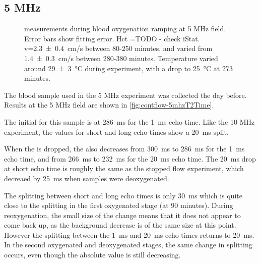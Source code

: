 \subsection{5 MHz}
\begin{figure}[h!t]
\centering
{}
\caption[\Ttwo measurements during blood oxygenation ramping at 5 MHz field]{\Ttwo measurements during blood oxygenation ramping at 5 MHz field. Error bars show \Ttwo fitting error. Hct =TODO - check iStat. v=\SI{2.3 \pm 0.4}{cm/s} between 80-250 minutes, and varied from \SI{1.4 \pm 0.3}{cm/s} between 280-380 minutes. Temperature varied around \SI{29 \pm 3}{\celsius} during experiment, with a drop to \SI{25}{\celsius} at 273 minutes.}
\label{fig:contflow-5mhzT2Time}
\end{figure}

The blood sample used in the 5 MHz experiment was collected the day before.
Results at the 5 MHz field are shown in \autoref{fig:contflow-5mhzT2Time}.

The initial \Ttwo for this sample is at \SI{286}{ms} for the \SI{1}{ms} echo time.
Like the 10 MHz experiment, the \Ttwo values for  short and long echo times show a \SI{20}{ms} split.

When the \SOtwo is dropped, the \Ttwo also decreases from \SI{300}{ms} to \SI{286}{ms} for the \SI{1}{ms} echo time, and from \SI{266}{ms} to \SI{232}{ms} for the \SI{20}{ms} echo time.
The \SI{20}{ms} drop at short echo time is roughly the same as the stopped flow experiment, which decreaed by \SI{25}{ms} when samples were deoxygenated.

The splitting between short and long echo times is only \SI{30}{ms} which is quite close to the splitting in the first oxygenated stage (at 90 minutes).
During reoxygenation, the small size of the \Ttwo change means that it does not appear to come back up, as the background \Ttwo decrease is of the same size at this point.
However the splitting between the \SI{1}{ms} and \SI{20}{ms} echo times returns to \SI{20}{ms}.
In the second oxygenated and deoxygenated stages, the same change in splitting occurs, even though the absolute \Ttwo value is still decreasing.

